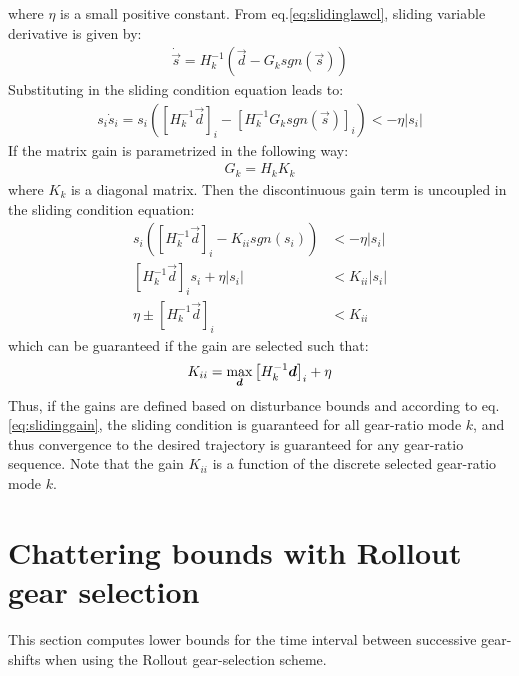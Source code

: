 %
where $\eta$ is a small positive constant. From eq.\eqref{eq:slidinglawcl}, sliding variable derivative is given by:
%
\begin{align}
\dot{\vec{s}} = H_k^{-1}(\vec{d} - G_k sgn( \vec{s} ))
\end{align}
%
Substituting in the sliding condition equation leads to:
%
\begin{align}
s_i \dot{s}_i  = s_i \left( \left[ H_k^{-1} \vec{d} \right]_i - \left[ H_k^{-1} G_k sgn(\vec{s}) \right]_i \right) < -\eta |s_i|
\end{align}
%
If the matrix gain is parametrized in the following way:
%
\begin{align}
G_k = H_k K_k
\end{align}
%
where $K_k$ is a diagonal matrix. Then the discontinuous gain term is uncoupled in the sliding condition equation:
%
\begin{align}
s_i \left( \left[ H_k^{-1} \vec{d} \right]_i - K_{ii} sgn( s_i ) \right) &< -\eta |s_i| \\
 \left[ H_k^{-1} \vec{d} \right]_i s_i + \eta |s_i| &< K_{ii} | s_i | \\
 \eta  \pm  \left[ H_k^{-1} \vec{d} \right]_i &< K_{ii} 
\end{align}
%
which can be guaranteed if the gain are selected such that:
%
\begin{align}
K_{ii} = \operatornamewithlimits{max}\limits_{\vec{d}} \left[ H_k^{-1} \vec{d} \right]_i + \eta
\label{eq:slidinggain}
\end{align}
%
Thus, if the gains are defined based on disturbance bounds and according to eq.\eqref{eq:slidinggain}, the sliding condition is guaranteed for all gear-ratio mode $k$, and thus convergence to the desired trajectory is guaranteed for any gear-ratio sequence. Note that the gain $K_{ii}$ is a function of the discrete selected gear-ratio mode $k$. 




\newpage

\section{Chattering bounds with Rollout gear selection}
\label{sec:chat}

This section computes lower bounds for the time interval between successive gear-shifts when using the Rollout gear-selection scheme. 

